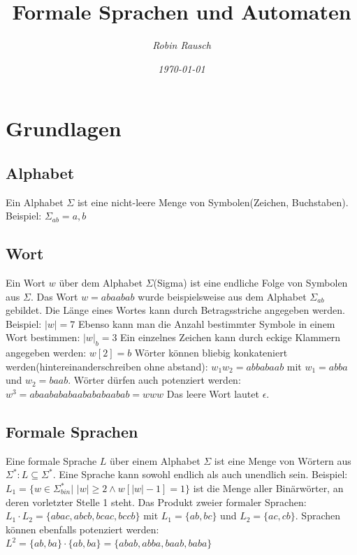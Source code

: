 \documentclass[12pt,a4paper]{article}
\author{\slshape Robin Rausch}
\title{Formale Sprachen und Automaten}
\date{\slshape \today}
\begin{document}
\maketitle
\tableofcontents
\newpage
\section{Grundlagen}
\subsection{Alphabet}
Ein Alphabet $\varSigma$ ist eine nicht-leere Menge von Symbolen(Zeichen, Buchstaben).
Beispiel: $\varSigma_{ab} = { a, b }$

\subsection{Wort}
Ein Wort $w$ über dem Alphabet $\varSigma$(Sigma) ist eine endliche Folge von Symbolen aus $\varSigma$. Das Wort $w = abaabab$ wurde beispielsweise aus dem Alphabet $\varSigma_{ab}$ gebildet.\newline
Die Länge eines Wortes kann durch Betragsstriche angegeben werden. Beispiel: $|w| = 7$\newline
Ebenso kann man die Anzahl bestimmter Symbole in einem Wort bestimmen: $|w|_b = 3$\newline
Ein einzelnes Zeichen kann durch eckige Klammern angegeben werden: $w[2] = b$\newline
Wörter können bliebig konkateniert werden(hintereinanderschreiben ohne abstand): $w_1w_2 = abbabaab$ mit $w_1 = abba$ und $w_2 = baab$.\newline
Wörter dürfen auch potenziert werden: $w^3 = abaabababaabababaabab = www$\newline
Das leere Wort lautet $\epsilon$.

\subsection{Formale Sprachen}
Eine formale Sprache $L$ über einem Alphabet $\varSigma$ ist eine Menge von Wörtern aus $\varSigma^*: L \subseteq \varSigma^*$. Eine Sprache kann sowohl endlich als auch unendlich sein.\newline
Beispiel: $L_1 = \{w \in \varSigma_{bin}^* |$ $|w| \geqslant 2 \wedge w[|w| - 1] = 1\}$ ist die Menge aller Binärwörter, an deren vorletzter Stelle 1 steht.\newline
Das Produkt zweier formaler Sprachen: $L_1 \cdot L_2 = \{abac, abcb, bcac, bccb\}$ mit $L_1 = \{ab, bc\}$ und $L_2 = \{ ac, cb\}$.\newline
Sprachen können ebenfalls potenziert werden: $L^2 = \{ab, ba\} \cdot \{ab, ba\} = \{ abab, abba, baab, baba\}$
\end{document}
